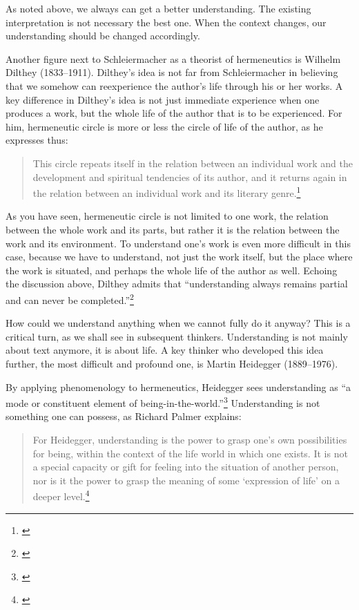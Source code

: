 As noted above, we always can get a better understanding. The existing interpretation is not necessary the best one. When the context changes, our understanding should be changed accordingly.

Another figure next to Schleiermacher as a theorist of hermeneutics is Wilhelm Dilthey (1833--1911). Dilthey's idea is not far from Schleiermacher in believing that we somehow can reexperience the author's life through his or her works. A key difference in Dilthey's idea is not just immediate experience when one produces a work, but the whole life of the author that is to be experienced. For him, hermeneutic circle is more or less the circle of life of the author, as he expresses thus:

\begin{quote}
This circle repeats itself in the relation between an individual work and the development and spiritual tendencies of its author, and it returns again in the relation between an individual work and its literary genre.\footnote{\citealp[p.~249]{dilthey:hermeneutics}}
\end{quote}

As you have seen, hermeneutic circle is not limited to one work, the relation between the whole work and its parts, but rather it is the relation between the work and its environment. To understand one's work is even more difficult in this case, because we have to understand, not just the work itself, but the place where the work is situated, and perhaps the whole life of the author as well. Echoing the discussion above, Dilthey admits that ``understanding always remains partial and can never be completed.''\footnote{\citealp[p.~249]{dilthey:hermeneutics}} 

How could we understand anything when we cannot fully do it anyway? This is a critical turn, as we shall see in subsequent thinkers. Understanding is not mainly about text anymore, it is about life. A key thinker who developed this idea further, the most difficult and profound one, is Martin Heidegger (1889--1976).

By applying phenomenology to hermeneutics, Heidegger sees understanding as ``a mode or constituent element of being-in-the-world.''\footnote{\citealp[p.~131]{palmer:hermeneutics}} Understanding is not something one can possess, as Richard Palmer explains:

\begin{quote}
For Heidegger, understanding is the power to grasp one's own possibilities for being, within the context of the life world in which one exists. It is not a special capacity or gift for feeling into the situation of another person, nor is it the power to grasp the meaning of some `expression of life' on a deeper level.\footnote{\citealp[p.~131]{palmer:hermeneutics}}
\end{quote}

